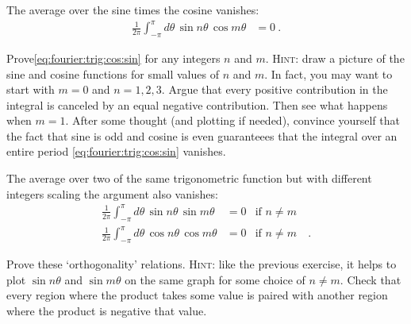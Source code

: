 The average over the sine times the cosine vanishes:
\begin{align}
    \frac{1}{2\pi}
    \int_{-\pi}^\pi d\theta\, \sin n\theta \, \cos m\theta 
    &= 0 \ .
    \label{eq:fourier:trig:cos:sin}
\end{align}
\begin{exercise}
Prove\sidenotemark \eqref{eq:fourier:trig:cos:sin} for any integers $n$ and $m$. \textsc{Hint}: draw a picture of the sine and cosine functions for small values of $n$ and $m$. In fact, you may want to start with $m=0$ and $n=1,2,3$. Argue that every positive contribution in the integral is canceled by an equal negative contribution. Then see what happens when $m=1$. After some thought (and plotting if needed), convince yourself that the fact that sine is odd and cosine is even guaranteees that the integral over an entire period \eqref{eq:fourier:trig:cos:sin} vanishes.
\end{exercise}
The average over two of the same trigonometric function but with different integers scaling the argument also vanishes:
\begin{align}
    \frac{1}{2\pi}
    \int_{-\pi}^\pi d\theta\, \sin n\theta \,\sin m\theta 
    &= 0
    &
    \text{if }n\neq m&
    \\
    \frac{1}{2\pi}
    \int_{-\pi}^\pi d\theta\, \cos n\theta \,\cos m\theta 
    &= 0 
    &
    \text{if }n\neq m&
    \ .
\end{align}
\begin{exercise}
Prove these `orthogonality' relations. \textsc{Hint}: like the previous exercise, it helps to plot $\sin n\theta$ and $\sin m\theta$ on the same graph for some choice of $n\neq m$. Check that every region where the product takes some value is paired with another region where the product is negative that value.
\end{exercise}


